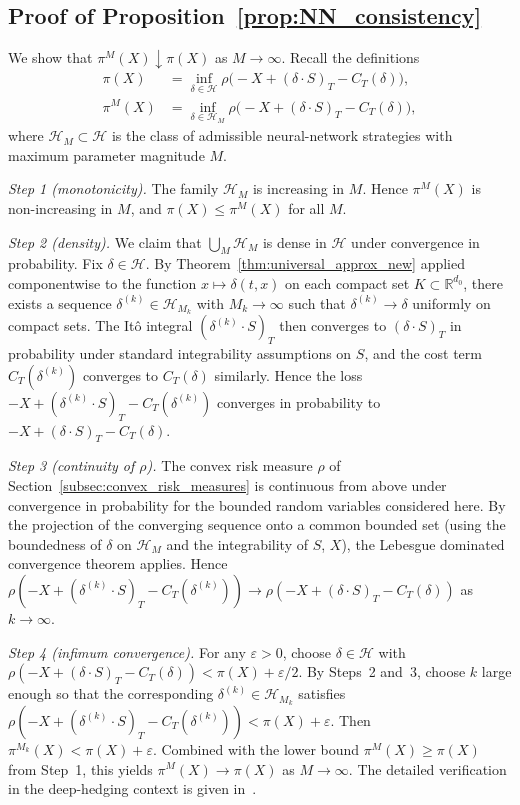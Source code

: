 \documentclass[12pt,a4paper]{article}
\theoremstyle{definition}
\theoremstyle{plain}
\theoremstyle{remark}
\theoremstyle{plain}
\begin{document}
\subsection{Proof of Proposition~\ref{prop:NN_consistency}}
\label{proof:nn_consistency}

We show that $\pi^M(X) \downarrow \pi(X)$ as $M \to \infty$. Recall
the definitions
\begin{align*}
\pi(X) &= \inf_{\delta \in \mathcal{H}}
   \rho\bigl(-X + (\delta \cdot S)_T - C_T(\delta)\bigr), \\
\pi^M(X) &= \inf_{\delta \in \mathcal{H}_M}
   \rho\bigl(-X + (\delta \cdot S)_T - C_T(\delta)\bigr),
\end{align*}
where $\mathcal{H}_M \subset \mathcal{H}$ is the class of admissible
neural-network strategies with maximum parameter magnitude $M$.

\textit{Step 1 (monotonicity).} The family $\mathcal{H}_M$ is increasing
in $M$. Hence $\pi^M(X)$ is non-increasing in $M$, and
$\pi(X) \leq \pi^M(X)$ for all $M$.

\textit{Step 2 (density).} We claim that
$\bigcup_M \mathcal{H}_M$ is dense in $\mathcal{H}$ under convergence
in probability. Fix $\delta \in \mathcal{H}$. By
Theorem~\ref{thm:universal_approx_new} applied componentwise to the
function $x \mapsto \delta(t, x)$ on each compact set $K \subset
\mathbb{R}^{d_0}$, there exists a sequence $\delta^{(k)} \in
\mathcal{H}_{M_k}$ with $M_k \to \infty$ such that $\delta^{(k)} \to
\delta$ uniformly on compact sets. The Itô integral
$(\delta^{(k)} \cdot S)_T$ then converges to $(\delta \cdot S)_T$ in
probability under standard integrability assumptions on $S$, and the
cost term $C_T(\delta^{(k)})$ converges to $C_T(\delta)$ similarly.
Hence the loss
$-X + (\delta^{(k)} \cdot S)_T - C_T(\delta^{(k)})$ converges in
probability to $-X + (\delta \cdot S)_T - C_T(\delta)$.

\textit{Step 3 (continuity of $\rho$).} The convex risk measure $\rho$
of Section~\ref{subsec:convex_risk_measures} is continuous from above
under convergence in probability for the bounded random variables
considered here. By the projection of the converging sequence onto a
common bounded set (using the boundedness of $\delta$ on $\mathcal{H}_M$
and the integrability of $S$, $X$), the Lebesgue dominated convergence
theorem applies. Hence
$\rho(-X + (\delta^{(k)} \cdot S)_T - C_T(\delta^{(k)})) \to
\rho(-X + (\delta \cdot S)_T - C_T(\delta))$ as $k \to \infty$.

\textit{Step 4 (infimum convergence).} For any $\varepsilon > 0$,
choose $\delta \in \mathcal{H}$ with
$\rho(-X + (\delta \cdot S)_T - C_T(\delta)) < \pi(X) + \varepsilon/2$.
By Steps~2 and~3, choose $k$ large enough so that the corresponding
$\delta^{(k)} \in \mathcal{H}_{M_k}$ satisfies
$\rho(-X + (\delta^{(k)} \cdot S)_T - C_T(\delta^{(k)})) <
\pi(X) + \varepsilon$. Then $\pi^{M_k}(X) < \pi(X) + \varepsilon$.
Combined with the lower bound $\pi^M(X) \geq \pi(X)$ from Step~1, this
yields $\pi^M(X) \to \pi(X)$ as $M \to \infty$. The detailed
verification in the deep-hedging context is given
in~\cite{Buehler2019DeepHedging}.
\end{document}
